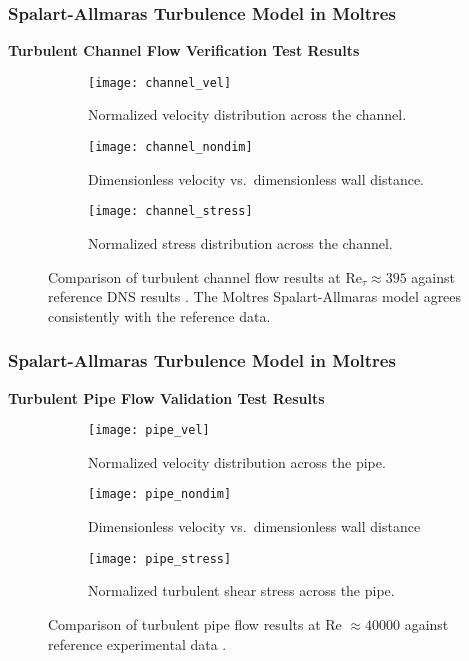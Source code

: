 \begin{frame}
  \frametitle{Spalart-Allmaras Turbulence Model in Moltres}
  \textbf{Turbulent Channel Flow Verification Test Results}
  \begin{figure}[htb!]
    \centering
    \begin{subfigure}[b]{0.32\columnwidth}
      \centering
      \texttt{[image: channel\_vel]}
      \caption{Normalized velocity distribution across the channel.}
      \label{fig:channel-vel}
    \end{subfigure}
    \hfill
    \begin{subfigure}[b]{0.32\columnwidth}
      \centering
      \texttt{[image: channel\_nondim]}
      \caption{Dimensionless velocity vs.\ dimensionless wall distance.}
      \label{fig:channel-nondim}
    \end{subfigure}
    \begin{subfigure}[b]{0.32\columnwidth}
      \centering
      \texttt{[image: channel\_stress]}
      \caption{Normalized stress distribution across the channel.}
      \label{fig:channel-stress}
    \end{subfigure}
    \caption{Comparison of turbulent channel flow results at Re$_\tau\approx395$ against reference
    \gls{DNS} results \cite{moser_direct_1999}. The Moltres Spalart-Allmaras model agrees consistently with
    the reference data.}
    \label{fig:channel-verification}
  \end{figure}
\end{frame}

\begin{frame}
  \frametitle{Spalart-Allmaras Turbulence Model in Moltres}
  \textbf{Turbulent Pipe Flow Validation Test Results}
  \begin{figure}[htb]
    \centering
    \begin{subfigure}[b]{0.32\columnwidth}
      \centering
      \texttt{[image: pipe\_vel]}
      \caption{Normalized velocity distribution across the pipe.}
      \label{fig:pipe-vel}
    \end{subfigure}
    \hfill
    \begin{subfigure}[b]{0.32\columnwidth}
      \centering
      \texttt{[image: pipe\_nondim]}
      \caption{Dimensionless velocity vs.\ dimensionless wall distance}
      \label{fig:pipe-nondim}
    \end{subfigure}
    \begin{subfigure}[b]{0.32\columnwidth}
      \centering
      \texttt{[image: pipe\_stress]}
      \caption{Normalized turbulent shear stress across the pipe.}
      \label{fig:pipe-stress}
    \end{subfigure}
    \caption{Comparison of turbulent pipe flow results at Re $\approx 40000$ against reference
    experimental data \cite{laufer_structure_1954}.}
    \label{fig:pipe-verification}
  \end{figure}
\end{frame}

